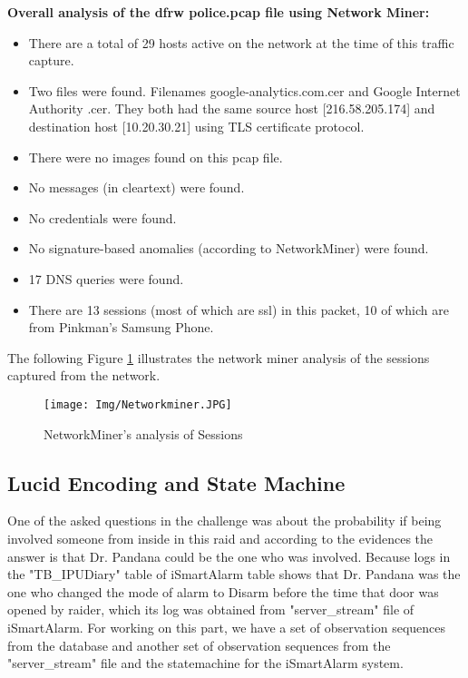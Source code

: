 \documentclass{easychair}
\begin{document}
\textbf{Overall analysis of the dfrw police.pcap file using Network Miner:}
\begin{itemize}
\item There are a total of 29 hosts active on the network at the time of this traffic capture.
\item Two files were found. Filenames google-analytics.com.cer and Google Internet Authority .cer. They both had the same source host [216.58.205.174] and destination host [10.20.30.21] using TLS certificate protocol. 
\item There were no images found on this pcap file.
\item No messages (in cleartext) were found.
\item No credentials were found.
\item No signature-based anomalies (according to NetworkMiner) were found.
\item 17 DNS queries were found.
\item There are 13 sessions (most of which are ssl) in this packet, 10 of which are from Pinkman’s Samsung Phone.
\end{itemize}

The following Figure \ref{fig:Network Miner’s analysis of Sessions} illustrates the network miner analysis of the sessions captured from the network.

\begin{figure}[H]
    \centering
    \texttt{[image: Img/Networkminer.JPG]}
    \caption{NetworkMiner’s analysis of Sessions}
    \label{fig:Network Miner’s analysis of Sessions}
\end{figure}

\subsection{Lucid Encoding and State Machine}
One of the asked questions in the challenge was about the probability if being involved someone from inside in this raid and according to the evidences the answer is that Dr. Pandana could be the one who was involved. Because logs in the "TB\_IPUDiary" table of iSmartAlarm table shows that Dr. Pandana was the one who changed the mode of alarm to Disarm before the time that door was opened by raider, which its log was obtained from "server\_stream" file of iSmartAlarm. 
For working on this part, we have a set of observation sequences from the database and another set of observation sequences from the "server\_stream" file and the statemachine for the iSmartAlarm system.\\
\end{document}
